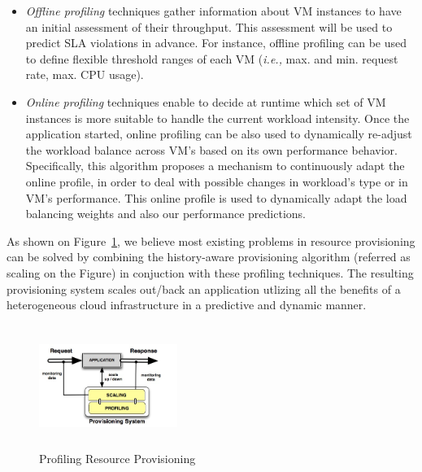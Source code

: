 \begin{itemize}
\item \emph{Offline profiling} techniques gather information about VM instances to have an initial assessment of their throughput. This assessment will be used to predict SLA violations in advance. For instance, offline profiling can be used to define flexible threshold ranges of each VM (\emph{i.e.,} max. and min. request rate, max. CPU usage).

\item \emph{Online profiling} techniques enable to decide at runtime which set of VM instances is more suitable to handle the current workload intensity. Once the application started, online profiling can be also used to dynamically re-adjust the workload balance across VM's based on its own performance behavior. Specifically,  this algorithm proposes a mechanism to continuously adapt the online profile, in order to deal with possible changes in workload's type or in VM's performance. This online profile is used to dynamically adapt the load balancing weights and also our performance predictions. 

\end{itemize}

As shown on Figure~\ref{model}, we believe most existing problems in resource provisioning can be solved by combining the history-aware provisioning algorithm (referred as scaling on the Figure) in conjuction with these profiling techniques. The resulting provisioning system scales out/back an application utlizing all the benefits of a heterogeneous cloud infrastructure in a predictive and dynamic manner.



\begin{figure}
\begin{center}
\includegraphics[width=0.4\textwidth, height=4cm]{./images/monitoringSchema.jpg}
\end{center}
\label{model}
\caption{Profiling Resource Provisioning}
\end{figure}
